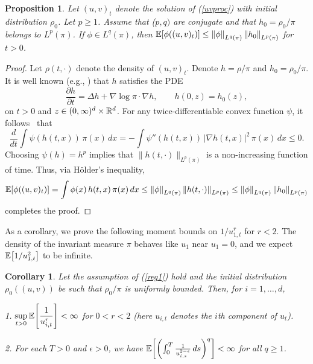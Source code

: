 \documentclass[11pt, twoside]{report}
\newtheorem{corollary}[theorem]{Corollary}
\newtheorem{proposition}[theorem]{Proposition}
\begin{document}
\begin{proposition}\label{l1}Let $(u,v)_t$ denote the solution of (\ref{uvproc}) with initial distribution $\rho_0$. Let $p\geq 1$. Assume that ($p,q)$ are conjugate and that  $h_0=\rho_0/\pi$ belongs to $L^p(\pi)$. If $\phi \in L^q(\pi)$, then $\mean{ \phi((u,v)_t)}\le \norm{\phi}_{L^q(\pi)}\, \norm{h_0}_{L^p(\pi)}$ for $t>0$.
\end{proposition}
%
\begin{proof} Let $\rho(t,\cdot)$ denote the density of $(u,v)_t$. Denote $h=\rho/\pi$ and $h_0=\rho_0/\pi$. It is well known (e.g., \cite{Markowich2004-dw}) that $h$ satisfies the PDE
\[
\frac{\partial h}{\partial t}=\Delta h + \nabla \log \pi\cdot \nabla h,\qquad h(0,z)=h_0(z),
\]
on $t>0$ and $z\in(0,\infty)^d\times \mathbb{R}^d$. For any twice-differentiable convex function $\psi$, it follows~\cite[Eq.~9]{Markowich2004-dw}   that
\[
\frac{d}{dt} \int \psi(h(t,x))\, \pi(x)\,dx=-\int \psi''(h(t,x))\,|\nabla h(t,x)|^2\,\pi(x)\,dx\le 0.\]
Choosing $\psi(h)=h^p$ implies that $\|h(t,\cdot)\|_{L^p(\pi)}$ is a non-increasing function of time.
Thus, via H\"{o}lder's inequality,
 \begin{align*}
     \mean{\phi((u,v)_t)}
 =\int \phi(x)\,h(t,x)\, \pi(x)\, dx
 \le \norm{\phi}_{L^{q}(\pi)} \, \norm{h(t,\cdot)}_{L^p(\pi)} \le \norm{\phi}_{L^{q}(\pi)} \, \norm{h_0}_{L^p(\pi)}
 \end{align*}
 completes the proof.
\end{proof}
As a corollary, we prove the following moment bounds on $1/u_{1,t}^r$ for $r<2$. The density of the invariant measure $\pi$ behaves like $u_1$ near $u_1=0$, and we expect $\mathbb{E}\bp{1/u_{1,t}^2}$ to be infinite. 
\begin{corollary}\label{cor} Let the assumption of (\ref{reg1}) hold and the initial distribution $\rho_0((u,v))$ be such that $\rho_0/\pi$ is uniformly bounded.
Then, for $i=1,\dots,d$,

1. $\displaystyle\sup_{t>0}\mathbb{E} \bp{\frac 1{u_{i,t}^r}}<\infty$ for $0<r<2$ (here $u_{i,t}$ denotes the $i$th component of $u_t$).\vspace{1ex}

2. For each $T>0$ and $\epsilon>0$, we have
 $\mean{\pp{\int_0^T \frac{1}{u_{i,s}^{2-\epsilon}}\,ds}^q} <\infty $ for all $q\ge 1$.
  
\end{corollary}
\end{document}
